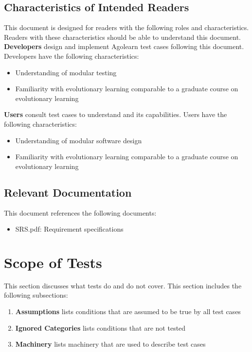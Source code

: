 \documentclass[12pt, titlepage]{article}
\begin{document}
\subsection{Characteristics of Intended Readers}
\label{subsec:characteristics}
This document is designed for readers with the following roles and characteristics. Readers with these characteristics should be able to understand this document.
\textbf{Developers} design and implement Agolearn test cases following this document. Developers have the following characteristics:
\begin{itemize}
  \item	Understanding of modular testing
  \item	Familiarity with evolutionary learning comparable to a graduate course on evolutionary learning
\end{itemize}

\textbf{Users} consult test cases to understand \thisproject and its capabilities. Users have the following characteristics:

\begin{itemize}
  \item	Understanding of modular software design
  \item	Familiarity with evolutionary learning comparable to a graduate course on evolutionary learning
\end{itemize}

\subsection{Relevant Documentation}
This document references the following documents:
\begin{itemize}
  \item	SRS.pdf: Requirement specifications 
\end{itemize}

\section{Scope of Tests}
This section discusses what tests do and do not cover. This section includes the following subsections:
\begin{enumerate}
  \item \textbf{Assumptions} lists conditions that are assumed to be true by all test cases
  \item \textbf{Ignored Categories} lists conditions that are not tested
  \item \textbf{Machinery} lists machinery that are used to describe test cases
\end{enumerate}
\end{document}
